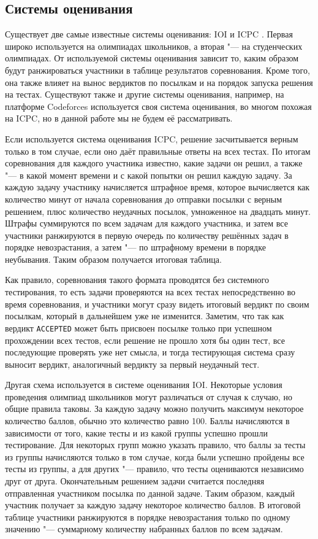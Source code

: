 \subsection{Системы оценивания}

Существует две самые известные системы оценивания: IOI и ICPC \cite{wiki}. Первая широко используется на олимпиадах школьников, а вторая "--- на студенческих олимпиадах. От используемой системы оценивания зависит то, каким образом будут ранжироваться участники в таблице результатов соревнования. Кроме того, она также влияет на вынос вердиктов по посылкам и на порядок запуска решения на тестах. Существуют также и другие системы оценивания, например, на платформе Codeforces \cite{codeforces} используется своя система оценивания, во многом похожая на ICPC, но в данной работе мы не будем её рассматривать.

Если используется система оценивания ICPC, решение засчитывается верным только в том случае, если оно даёт правильные ответы на всех тестах. По итогам соревнования для каждого участника известно, какие задачи он решил, а также "--- в какой момент времени и с какой попытки он решил каждую задачу. За каждую задачу участнику начисляется штрафное время, которое вычисляется как количество минут от начала соревнования до отправки посылки с верным решением, плюс количество неудачных посылок, умноженное на двадцать минут. Штрафы суммируются по всем задачам для каждого участника, и затем все участники ранжируются в первую очередь по количеству решённых задач в порядке невозрастания, а затем "--- по штрафному времени в порядке неубывания. Таким образом получается итоговая таблица.

Как правило, соревнования такого формата проводятся без системного тестирования, то есть задачи проверяются на всех тестах непосредственно во время соревнования, и участники могут сразу видеть итоговый вердикт по своим посылкам, который в дальнейшем уже не изменится. Заметим, что так как вердикт \texttt{ACCEPTED} может быть присвоен посылке только при успешном прохождении всех тестов, если решение не прошло хотя бы один тест, все последующие проверять уже нет смысла, и тогда тестирующая система сразу выносит вердикт, аналогичный вердикту за первый неудачный тест.

Другая схема используется в системе оценивания IOI. Некоторые условия проведения олимпиад школьников могут различаться от случая к случаю, но общие правила таковы. За каждую задачу можно получить максимум некоторое количество баллов, обычно это количество равно 100. Баллы начисляются в зависимости от того, какие тесты и из какой группы успешно прошли тестирование. Для некоторых групп можно указать правило, что баллы за тесты из группы начисляются только в том случае, когда были успешно пройдены все тесты из группы, а для других "--- правило, что тесты оцениваются независимо друг от друга. Окончательным решением задачи считается последняя отправленная участником посылка по данной задаче. Таким образом, каждый участник получает за каждую задачу некоторое количество баллов. В итоговой таблице участники ранжируются в порядке невозрастания только по одному значению "--- суммарному количеству набранных баллов по всем задачам.


